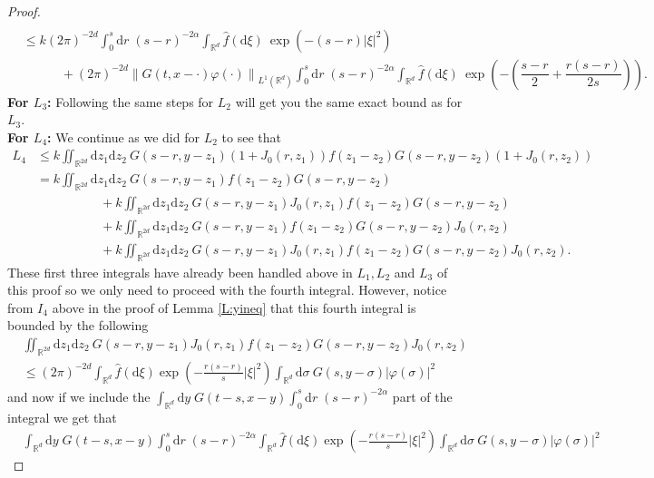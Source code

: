 \documentclass[a4paper,11pt]{article}%
\numberwithin{equation}{section}
\theoremstyle{plain}
\theoremstyle{definition}
\newcommand{\R}{\mathbb{R}}
\newcommand{\Norm}[1]{\left\|  #1   \right\|}
\newcommand{\ud}{\ensuremath{ \mathrm{d} }}
\begin{document}
\begin{proof}
\begin{align*}
	\\ & \le k  (2\pi)^{-2d}\int_0^s\ud r\; (s-r)^{-2\alpha}\int_{\R^d}\widehat{f} (\ud \xi)\: \exp(-(s-r)|\xi|^2)
	\\ & \hspace{3em}+ (2\pi)^{-2d}  \Norm{G(t,x-\cdot)\varphi(\cdot)}_{L^1(\R^d)}\int_0^s\ud r\; (s-r)^{-2\alpha}\int_{\R^d}\widehat{f}(\ud \xi) \: \exp\left(-\left(\dfrac{s-r}{2}+\dfrac{r(s-r)}{2s}\right)\right).
	\end{align*}
	\noindent \textbf{For $L_3$:} Following the same steps for $L_2$ will get you the same exact bound as for $L_3$. \\

	\noindent \textbf{For $L_4$:} We continue as we did for $L_2$ to see that
	\begin{align*}
	L_4 &\le k\iint_{\R^{2d}}\ud z_1 \ud z_2\:G(s-r,y-z_1)(1+J_0(r,z_1))f(z_1-z_2)G(s-r,y-z_2)(1+J_0(r,z_2))
	\\&= k\iint_{\R^{2d}}\ud z_1 \ud z_2\:G(s-r,y-z_1)f(z_1-z_2)G(s-r,y-z_2)
	\\&\hspace{5em}+k\iint_{\R^{2d}}\ud z_1 \ud z_2\:G(s-r,y-z_1)J_0(r,z_1)f(z_1-z_2)G(s-r,y-z_2)
	\\&\hspace{5em}+ k\iint_{\R^{2d}}\ud z_1 \ud z_2\:G(s-r,y-z_1)f(z_1-z_2)G(s-r,y-z_2)J_0(r,z_2)
	\\&\hspace{5em}+k\iint_{\R^{2d}}\ud z_1 \ud z_2\:G(s-r,y-z_1)J_0(r,z_1)f(z_1-z_2)G(s-r,y-z_2)J_0(r,z_2).
	\end{align*}
	These first three integrals have already been handled above in $L_1, L_2$ and $L_3$ of this proof so we only need to proceed with the fourth integral. However, notice from $I_4$ above in the proof of Lemma \ref{L:yineq} that this fourth integral is bounded by the following
	\begin{align*}
	&\iint_{\R^{2d}}\ud z_1 \ud z_2\:G(s-r,y-z_1)J_0(r,z_1)f(z_1-z_2)G(s-r,y-z_2)J_0(r,z_2)
	\\ &\le (2\pi)^{-2d}\int_{\R^d} \hat{f}(\ud \xi)\exp\left(-\frac{r(s-r)}{s}|\xi|^2\right) \int_{\R^{d}}\ud \sigma\:G(s,y-\sigma)|\varphi(\sigma)|^2
	\end{align*}
	and now if we include the $\int_{\R^d}\ud y \;G(t-s,x-y)\int_0^s\ud r\; (s-r)^{-2\alpha}$ part of the integral we get that
	\begin{align*}
	&\int_{\R^d}\ud y \;G(t-s,x-y)\int_0^s\ud r\; (s-r)^{-2\alpha}\int_{\R^d} \hat{f}(\ud \xi)\exp\left(-\frac{r(s-r)}{s}|\xi|^2\right) \int_{\R^{d}}\ud \sigma\:G(s,y-\sigma)|\varphi(\sigma)|^2

\end{align*}
\end{proof}
\end{document}
